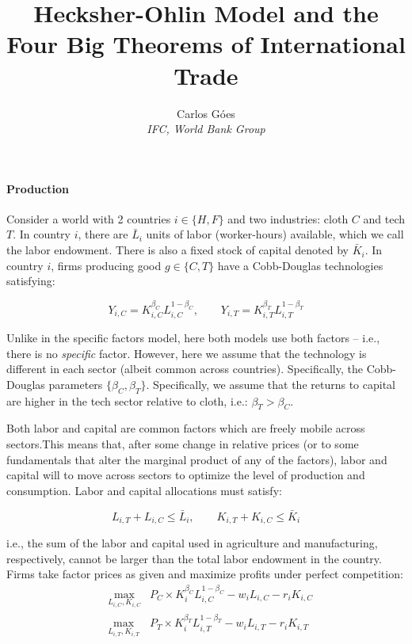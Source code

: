 \documentclass[11pt,letterpaper]{article}
\begin{document}
\title{\textbf{Hecksher-Ohlin Model and the Four Big Theorems of International Trade}}
\author{\large%
\setcounter{footnote}{0}%
Carlos G\'{o}es \\[-3pt] \textit{\small IFC, World Bank Group}
}
\maketitle

\paragraph{Production} Consider a world with 2 countries $i \in \{ H, F\}$ and two industries: cloth $C$ and tech $T$. In country $i$, there are $\bar{L}_i$ units of labor (worker-hours) available, which we call the labor endowment. There is also a fixed stock of capital denoted by $\bar{K}_i$. In country $i$, firms producing good $g \in \{ C, T\}$ have a Cobb-Douglas technologies satisfying:

\begin{equation*}
 Y_{i,C} = K_{i,C}^{\beta_C} L_{i,C}^{1-\beta_C}, \qquad  Y_{i,T} = K_{i,T}^{\beta_T} L_{i,T}^{1-\beta_T}
\end{equation*}

Unlike in the specific factors model, here both models use both factors -- i.e., there is no \textit{specific} factor. However, here we assume that the technology is different in each sector (albeit common across countries). Specifically, the Cobb-Douglas parameters $\{\beta_C,\beta_T\}$. Specifically, we assume that the returns to capital are higher in the tech sector relative to cloth, i.e.: $\beta_T > \beta_C$.

Both labor and capital are common factors which are freely mobile across sectors.This means that, after some change in relative prices (or to some fundamentals that alter the marginal product of any of the factors), labor and capital will to move across sectors to optimize the level of production and consumption. Labor and capital allocations must satisfy:

\begin{equation*}
    L_{i,T} + L_{i,C} \le \bar{L}_i, \qquad K_{i,T} + K_{i,C} \le \bar{K}_i
\end{equation*}

\noindent i.e., the sum of the labor and capital used in agriculture and manufacturing, respectively, cannot be larger than the total labor endowment in the country. Firms take factor prices as given and maximize profits under perfect competition:
        \begin{eqnarray*}\label{eq: production}
            &\max_{L_{i,C}, K_{i,C}}& P_{C} \times K_{i}^{\beta_C} L_{i,C}^{1-\beta_C} - w_i L_{i,C} - r_{i} K_{i,C} \\
            &\max_{L_{i,T}, K_{i,T}}& P_{T} \times K_{i}^{\beta_T} L_{i,T}^{1-\beta_T} - w_i L_{i,T} - r_{i} K_{i,T} 
        \end{eqnarray*}
\end{document}
